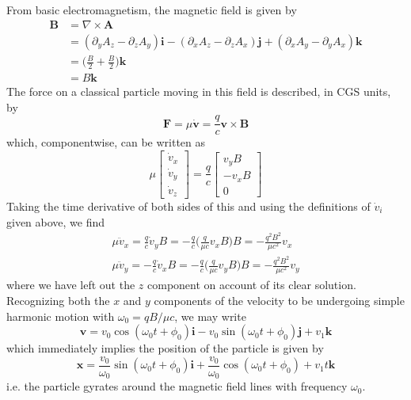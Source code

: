 \documentclass[../principles-of-quantum-mechanics.tex]{subfiles}
\begin{document}
\begin{questions}
	\begin{solution}
		From basic electromagnetism, the magnetic field is given by
		\begin{align*}	
			\mathbf{B} &= \nabla \times \mathbf{A} \\
			&= (\partial_yA_z - \partial_zA_y)\mathbf{i} - (\partial_xA_z - \partial_zA_x)\mathbf{j} + (\partial_xA_y - \partial_yA_x)\mathbf{k} \\
			&= \Big(\frac{B}{2} + \frac{B}{2}\Big)\mathbf{k} \\
			&= B\mathbf{k}
		\end{align*}
		The force on a classical particle moving in this field is described, in CGS units, by 
		$$\mathbf{F} = \mu\dot{\mathbf{v}} = \frac{q}{c}\mathbf{v}\times\mathbf{B}$$
		which, componentwise, can be written as
		$$\mu\begin{bmatrix}\dot{v}_x \\ \dot{v}_y \\ \dot{v}_z\end{bmatrix} = \frac{q}{c}\begin{bmatrix}v_yB \\ -v_xB \\ 0\end{bmatrix}$$
		Taking the time derivative of both sides of this and using the definitions of $\dot{v}_i$ given above, we find
		\begin{gather*}
			\mu\ddot{v}_x = \frac{q}{c}\dot{v}_yB = -\frac{q}{c}\Big(\frac{q}{\mu c}v_xB\Big)B = -\frac{q^2B^2}{\mu c^2}v_x \\
			\mu\ddot{v}_y = -\frac{q}{c}\dot{v}_xB = -\frac{q}{c}\Big(\frac{q}{\mu c}v_yB\Big)B = -\frac{q^2B^2}{\mu c^2}v_y
		\end{gather*}
		where we have left out the $z$ component on account of its clear solution. Recognizing both the $x$ and $y$ components of the velocity to be undergoing simple harmonic motion with $\omega_0 = qB/\mu c$, we may write
		$$\mathbf{v} = v_0\cos(\omega_0 t + \phi_0)\mathbf{i} - v_0\sin(\omega_0 t + \phi_0)\mathbf{j} + v_1\mathbf{k}$$
		which immediately implies the position of the particle is given by
		$$\mathbf{x} = \frac{v_0}{\omega_0}\sin(\omega_0 t + \phi_0)\mathbf{i} + \frac{v_0}{\omega_0}\cos(\omega_0 t + \phi_0) + v_1t\mathbf{k}$$
		i.e. the particle gyrates around the magnetic field lines with frequency $\omega_0$.


\end{solution}
\end{questions}
\end{document}
